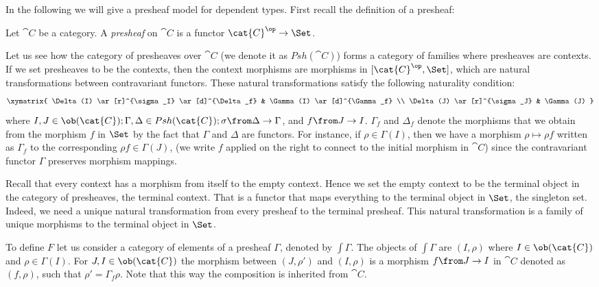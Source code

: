 In the following we will give a presheaf model for dependent types. First
recall the definition of a presheaf:

\begin{definition}[Presheaf]
  Let $\cat{C}$ be a category. A \emph{presheaf} on $\cat{C}$ is a functor
  $\cat{C}^\op \to \Set$.
\end{definition}

Let us see how the category of presheaves over $\cat{C}$ (we denote it as
$Psh(\cat{C})$) forms a category of families where presheaves are contexts. If
we set presheaves to be the contexts, then the context morphisms are morphisms
in $[\cat{C}^\op, \Set]$, which are natural transformations between
contravariant functors. These natural transformations satisfy the following
naturality condition:
\[
  \xymatrix{
    \Delta(I) \ar[r]^{\sigma_I} \ar[d]^{\Delta_f} & \Gamma(I) \ar[d]^{\Gamma_f} \\
    \Delta(J) \ar[r]^{\sigma_J} & \Gamma(J)
  }
\]
where $I, J \in \ob(\cat{C}); \Gamma, \Delta \in Psh(\cat{C}); \sigma \from
\Delta \to \Gamma$, and $f \from J \to I$. $\Gamma_f$ and $\Delta_f$ denote the
morphisms that we obtain from the morphism $f$ in $\Set$ by the fact that
$\Gamma$ and $\Delta$ are functors. For instance, if $\rho \in \Gamma(I)$, then
we have a morphism $\rho \mapsto \rho f$ written as $\Gamma_f$ to the
corresponding $\rho f \in \Gamma(J)$, (we write $f$ applied on the right to
connect to the initial morphism in $\cat{C}$) since the contravariant functor
$\Gamma$ preserves morphism mappings.

Recall that every context has a morphism from itself to the empty context.
Hence we set the empty context to be the terminal object in the category of
presheaves, the terminal context. That is a functor that maps everything to
the terminal object in $\Set$, the singleton set. Indeed, we need a unique
natural transformation from every presheaf to the terminal presheaf. This
natural transformation is a family of unique morphisms to the terminal object
in $\Set$.

To define $F$ let us consider a category of elements of a presheaf $\Gamma$,
denoted by $\int\Gamma$. The objects of $\int \Gamma$ are $(I, \rho)$ where
$I \in \ob(\cat{C})$ and $\rho \in \Gamma(I)$. For $J, I \in \ob(\cat{C})$ the
morphism between $(J, \rho')$ and $(I, \rho)$ is a morphism $f \from J \to I$
in $\cat{C}$ denoted as $(f, \rho)$, such that $\rho' = \Gamma_f \rho$. Note
that this way the composition is inherited from $\cat{C}$.

